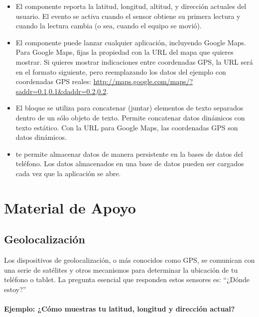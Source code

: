 \begin{itemize}

\item El componente  reporta la latitud,
  longitud, altitud, y dirección actuales del usuario. El evento
   se activa cuando el sensor obtiene su
  primera lectura y cuando la lectura cambia (o sea, cuando el equipo
  se movió).

\item El componente  puede lanzar cualquier
  aplicación, incluyendo Google Maps. Para Google Maps, fijas la
  propiedad  con la URL del mapa que quieres
  mostrar. Si quieres mostrar indicaciones entre coordenadas GPS, la
  URL será en el formato siguiente, pero reemplazando los datos del
  ejemplo con coordenadas GPS reales:
  \url{http://maps.google.com/maps/?saddr=0.1,0.1\&daddr=0.2,0.2}.

\item El bloque  se utiliza para concatenar (juntar)
  elementos de texto separados dentro de un sólo objeto de
  texto. Permite concatenar datos dinámicos con texto estático. Con la
  URL para Google Maps, las coordenadas GPS son datos dinámicos.

\item {} te permite almacenar datos de manera
  persistente en la bases de datos del teléfono. Los datos almacenados
  en una base de datos pueden ser cargados cada vez que la aplicación
  se abre.
\end{itemize}

\section{Material de Apoyo}

\subsection*{Geolocalización}

Los dispositivos de geolocalización, o más conocidos como GPS, se
comunican con una serie de satélites y otros mecanismos para
determinar la ubicación de tu teléfono o tablet. La pregunta esencial
que responden estos sensores es: ``¿Dónde estoy?''

\paragraph{Ejemplo: ¿Cómo muestras tu latitud, longitud y dirección
  actual?}

